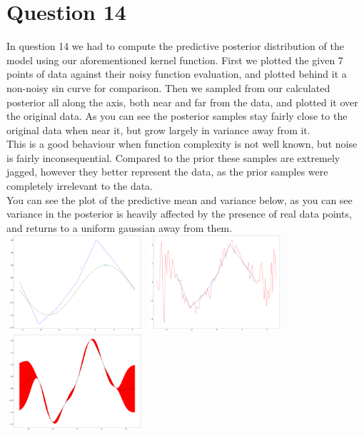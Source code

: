 \documentclass[a4paper, 9pt]{article}
\begin{document}
\section*{Question 14}
In question 14 we had to compute the predictive posterior distribution of the model using our aforementioned kernel function.
First we plotted the given 7 points of data against their noisy function evaluation, and plotted behind it a non-noisy sin curve for comparison. Then we sampled from our calculated posterior all along the axis, both near and far from the data, and plotted it over the original data. As you can see the posterior samples stay fairly close to the original data when near it, but grow largely in variance away from it. \\
This is a good behaviour when function complexity is not well known, but noise is fairly inconsequential. Compared to the prior these samples are extremely jagged, however they better represent the data, as the prior samples were completely irrelevant to the data. \\
You can see the plot of the predictive mean and variance below, as you can see variance in the posterior is heavily affected by the presence of real data points, and returns to a uniform gaussian away from them. \\
\newline
\includegraphics[width=2in,height=1.4in]{curve1}
\includegraphics[width=2in,height=1.4in]{curve2} 
\includegraphics[width=2in,height=1.4in]{curve3} \\
\end{document}
